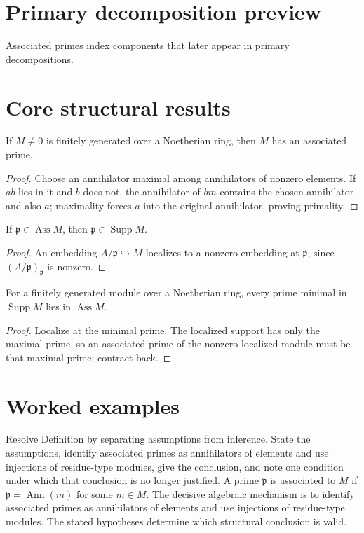 \section{Primary decomposition preview}
Associated primes index components that later appear in primary decompositions.

\section{Core structural results}

\begin{theorem}\label{thm:v17-01}
If $M\ne0$ is finitely generated over a Noetherian ring, then $M$ has an associated prime.
\begin{proof}
Choose an annihilator maximal among annihilators of nonzero elements. If $ab$ lies in it and $b$ does not, the annihilator of $bm$ contains the chosen annihilator and also $a$; maximality forces $a$ into the original annihilator, proving primality.
\end{proof}
\end{theorem}

\begin{theorem}\label{thm:v17-02}
If $\mathfrak p\in\operatorname{Ass}M$, then $\mathfrak p\in\operatorname{Supp}M$.
\begin{proof}
An embedding $A/\mathfrak p\hookrightarrow M$ localizes to a nonzero embedding at $\mathfrak p$, since $(A/\mathfrak p)_{\mathfrak p}$ is nonzero.
\end{proof}
\end{theorem}

\begin{theorem}\label{thm:v17-03}
For a finitely generated module over a Noetherian ring, every prime minimal in $\operatorname{Supp}M$ lies in $\operatorname{Ass}M$.
\begin{proof}
Localize at the minimal prime. The localized support has only the maximal prime, so an associated prime of the nonzero localized module must be that maximal prime; contract back.
\end{proof}
\end{theorem}

\section{Worked examples}

\begin{example}\label{ex:v17-worked-01}
Resolve Definition by separating assumptions from inference. State the assumptions, identify associated primes as annihilators of elements and use injections of residue-type modules, give the conclusion, and note one condition under which that conclusion is no longer justified. A prime $\mathfrak p$ is associated to $M$ if $\mathfrak p=\operatorname{Ann}(m)$ for some $m\in M$. The decisive algebraic mechanism is to identify associated primes as annihilators of elements and use injections of residue-type modules. The stated hypotheses determine which structural conclusion is valid.
\end{example}

